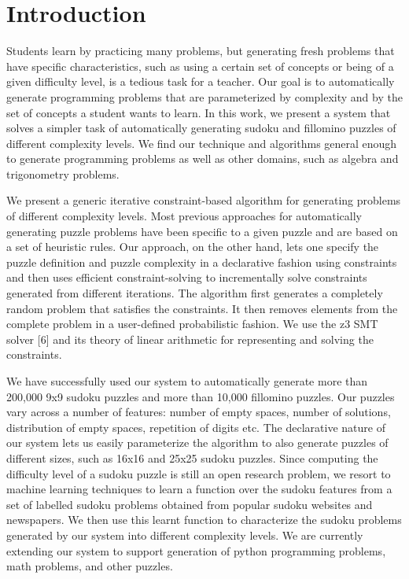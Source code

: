 \section{Introduction}

Students learn by practicing many problems, but generating fresh problems that have specific characteristics, such as using a certain set of concepts or being of a given difficulty level, is a
tedious task for a teacher. Our goal is to automatically generate programming problems that are parameterized by complexity and by the set of concepts a student wants to learn. In this work, we present a system that solves a simpler task of automatically generating sudoku and fillomino puzzles of different complexity levels. We find our technique and algorithms general enough to generate programming problems as well as other domains, such as algebra and trigonometry problems.

We present a generic iterative constraint-based algorithm for generating problems of different complexity levels. Most previous approaches for automatically generating puzzle problems have been specific to a given puzzle and are based on a set of heuristic rules. Our approach, on the other hand, lets one specify the puzzle definition and puzzle complexity in a declarative fashion using constraints and then uses efficient constraint-solving to incrementally solve constraints generated from different iterations. The algorithm first generates a completely random problem that satisfies the constraints. It then removes elements from the complete problem in a user-defined probabilistic fashion. We use the z3 SMT solver [6] and its theory of linear arithmetic for representing and solving the constraints.

We have successfully used our system to automatically generate more than 200,000 9x9 sudoku puzzles and more than 10,000 fillomino puzzles. Our puzzles vary across a number of features: number of empty spaces, number of solutions, distribution of empty spaces, repetition of digits etc. The declarative nature of our system lets us easily parameterize the algorithm to also generate puzzles of different sizes, such as 16x16 and 25x25 sudoku puzzles. Since computing the difficulty level of a sudoku puzzle is still an open research problem, we resort to machine learning techniques to learn a function over the sudoku features from a set of labelled sudoku problems obtained from popular sudoku websites and newspapers. We then use this learnt function to characterize the sudoku problems generated by our system into different complexity levels. We are currently extending our system to support generation of python programming problems, math problems, and other puzzles.
